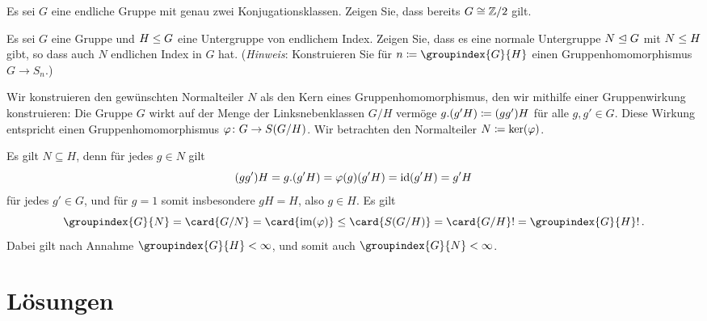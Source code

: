 \documentclass[a4paper, 10pt]{scrartcl}
\begin{document}
\begin{question}
  Es sei $G$ eine endliche Gruppe mit genau zwei Konjugationsklassen.
  Zeigen Sie, dass bereits $G \cong \mathbb{Z}/2$ gilt.
\end{question}

\begin{question}
  Es sei $G$ eine Gruppe und $H \mathrel{\leq} G$ eine Untergruppe von endlichem Index.
  Zeigen Sie, dass es eine normale Untergruppe $N \mathrel{\trianglelefteq} G$ mit $N \mathrel{\leq} H$ gibt, so dass auch $N$ endlichen Index in $G$ hat.
  \newline
  (\emph{Hinweis}:
  Konstruieren Sie für $n \defined \groupindex{G}{H}$ einen Gruppenhomomorphismus $G \to S_n$.)
\end{question}

\begin{solution}
  Wir konstruieren den gewünschten Normalteiler $N$ als den Kern eines Gruppenhomomorphismus, den wir mithilfe einer Gruppenwirkung konstruieren:
  Die Gruppe $G$ wirkt auf der Menge der Linksnebenklassen $G/H$ vermöge $g.(g'H) \coloneqq  (gg')H$ für alle $g, g' \in G$.
  Diese Wirkung entspricht einen Gruppenhomomorphismus $\varphi \colon G \to S(G/H)$.
  Wir betrachten den Normalteiler $N \coloneqq \ker(\varphi)$.
  
  Es gilt $N \subseteq H$, denn für jedes $g \in N$ gilt
  \[
      (gg')H
    = g.(g'H)
    = \varphi(g)(g'H)
    = \operatorname{id}(g'H)
    = g'H
  \]
  für jedes $g' \in G$, und für $g = 1$ somit insbesondere $gH = H$, also $g \in H$.
  Es gilt
  \[
          \groupindex{G}{N}
    =     \card{G/N}
    =     \card{\im(\varphi)}
    \leq  \card{\symmetric{G/H}}
    =     \card{G/H}!
    =     \groupindex{G}{H}! \,.
  \]
  Dabei gilt nach Annahme $\groupindex{G}{H} < \infty$, und somit auch $\groupindex{G}{N} < \infty$.
\end{solution}




\pagebreak





\section{Lösungen}

\printsolutions


\end{document}

